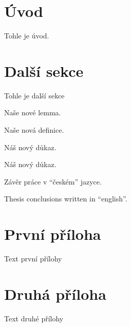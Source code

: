 \documentclass[a4paper,12pt]{article}
\begin{document}
\upmaketitle

\upthanksanot

\uptocandlists

\section{Úvod}
Tohle je úvod.

\section{Další sekce}
Tohle je další sekce

\begin{uplemma}
Naše nové lemma.
\end{uplemma}

\begin{uptheorem}
Naše nová definice.
\end{uptheorem}

\begin{upproof}
Náš nový důkaz.
\end{upproof}

\begin{upquote}
Náš nový důkaz.
\end{upquote}

\begin{upconclusions}[czech]
Závěr práce v \enquote{českém} jazyce.
\end{upconclusions}

\begin{upconclusions}[english]
Thesis conclusions written in \enquote{english}.
\end{upconclusions}

\upprintabbrevlist

\upprinttheoremlist

\upprintbibliography

\upappendix
\section{První příloha}
Text první přílohy

\section{Druhá příloha}
Text druhé přílohy

\upprintindex
\end{document}
